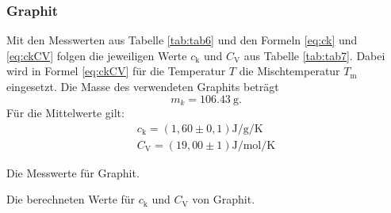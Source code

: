 \subsubsection{Graphit}

Mit den Messwerten aus Tabelle \ref{tab:tab6} und den Formeln \eqref{eq:ck} und \eqref{eq:ckCV} folgen die jeweiligen Werte $c_\text{k}$ und $C_\text{V}$ aus Tabelle \ref{tab:tab7}. Dabei wird in Formel \eqref{eq:ckCV} für die Temperatur $T$ die Mischtemperatur $T_\text{m}$ eingesetzt. Die Masse des verwendeten Graphits beträgt \[m_k = \SI{106,43}{\gram}.\]
Für die Mittelwerte gilt:
\begin{align*}
	c_\text{k} = (1,60\pm0,1)\si{\joule\per\gram\per\kelvin} \\
	C_\text{V} = (19,00\pm1)\si{\joule\per\mol\per\kelvin}
\end{align*}
\begin{table}
	\centering
	\caption{Die Messwerte für Graphit.}
	
	\label{tab:tab6}
\end{table}
\begin{table}
	\centering
	\caption{Die berechneten Werte für $c_\text{k}$ und $C_\text{V}$ von Graphit.}
	
	\label{tab:tab7}
\end{table}



